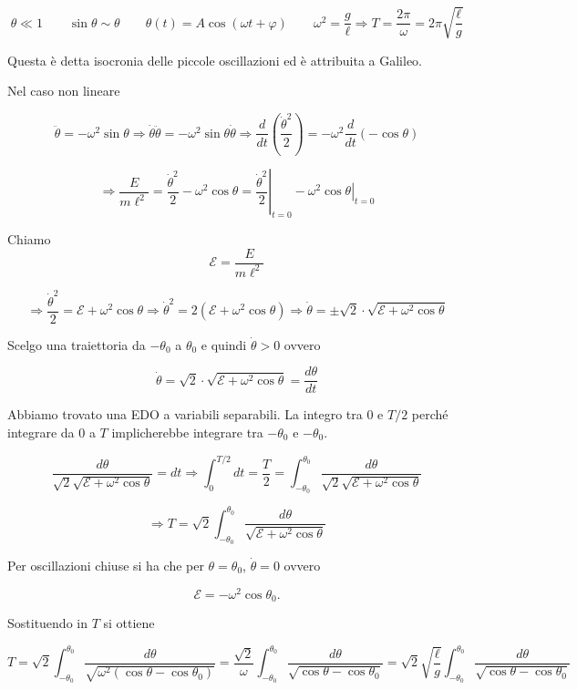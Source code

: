 \begin{example}{}
\[
\theta\ll 1
\qquad
\sin\theta\sim\theta
\qquad
\theta(t)=A\cos(\omega t+\varphi)
\qquad
\omega^2=\frac{g}{\ell}
\Rightarrow
T=\frac{2\pi}{\omega}=2\pi\sqrt{\frac{\ell}{g}}
\]

Questa è detta isocronia delle piccole oscillazioni ed è attribuita a Galileo.

Nel caso non lineare

\[
\ddot{\theta}=-\omega^2\sin\theta
\Rightarrow
\dot{\theta}\ddot{\theta}=-\omega^2\sin\theta\dot{\theta}
\Rightarrow
\frac{d}{dt}\left(\frac{\dot{\theta}^2}{2}\right)
=
-\omega^2\frac{d}{dt}(-\cos\theta)
\]

\[
\Rightarrow
\frac{E}{m\ell^2}
=
\frac{\dot{\theta}^2}{2}-\omega^2\cos\theta
=
\left.\frac{\dot{\theta}^2}{2}\right|_{t=0}
-
\left.\omega^2\cos\theta\right|_{t=0}
\]

Chiamo
\[
\mathcal{E}=\frac{E}{m\ell^2}
\]

\[
\Rightarrow
\frac{\dot{\theta}^2}{2}=\mathcal{E}+\omega^2\cos\theta
\Rightarrow
\dot{\theta}^2=2(\mathcal{E}+\omega^2\cos\theta)
\Rightarrow
\dot{\theta}=\pm\sqrt{2}\cdot\sqrt{\mathcal{E}+\omega^2\cos\theta}
\]

Scelgo una traiettoria da \(-\theta_0\) a \(\theta_0\) e quindi \(\dot{\theta}>0\) ovvero

\[
\dot{\theta}
=
\sqrt{2}\cdot\sqrt{\mathcal{E}+\omega^2\cos\theta}
=
\frac{d\theta}{dt}
\]

Abbiamo trovato una EDO a variabili separabili. La integro tra \(0\) e \(T/2\) perché integrare da \(0\) a \(T\) implicherebbe integrare tra \(-\theta_0\) e \(-\theta_0\).

\[
\frac{d\theta}{\sqrt{2}\sqrt{\mathcal{E}+\omega^2\cos\theta}}=dt
\Rightarrow
\int_{0}^{T/2}dt=\frac{T}{2}
=
\int_{-\theta_0}^{\theta_0}
\frac{d\theta}{\sqrt{2}\sqrt{\mathcal{E}+\omega^2\cos\theta}}
\]

\[
\Rightarrow
T
=
\sqrt{2}
\int_{-\theta_0}^{\theta_0}
\frac{d\theta}{\sqrt{\mathcal{E}+\omega^2\cos\theta}}
\]

Per oscillazioni chiuse si ha che per \(\theta=\theta_0\), \(\dot{\theta}=0\) ovvero

\[
\mathcal{E}=-\omega^2\cos\theta_0.
\]

Sostituendo in \(T\) si ottiene

\[
T
=
\sqrt{2}
\int_{-\theta_0}^{\theta_0}
\frac{d\theta}{\sqrt{\omega^2(\cos\theta-\cos\theta_0)}}
=
\frac{\sqrt{2}}{\omega}
\int_{-\theta_0}^{\theta_0}
\frac{d\theta}{\sqrt{\cos\theta-\cos\theta_0}}
=
\sqrt{2}\sqrt{\frac{\ell}{g}}
\int_{-\theta_0}^{\theta_0}
\frac{d\theta}{\sqrt{\cos\theta-\cos\theta_0}}
\]


\end{example}
